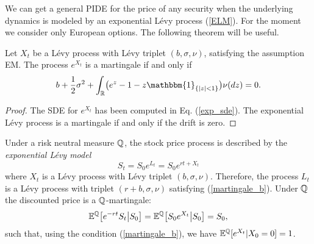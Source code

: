 We can get a general PIDE for the price of any security when the underlying dynamics is modeled by an exponential L\'evy process (\ref{ELM}). For the moment we consider only European
options. 
The following theorem will be useful.
\begin{Theorem}
 Let $X_t$ be a Lévy process with Lévy triplet $(b,\sigma,\nu)$, satisfying the assumption EM. The process $e^{X_t}$ is a martingale if and only if
 \begin{equation}\label{martingale_b}
  b +\frac{1}{2} \sigma^2  + \int_{\R} \bigl( e^z-1 -z\mathbbm{1}_{\{ |z|<1 \}} \bigr) \nu(dz) = 0.
 \end{equation}
\end{Theorem}
\begin{proof}
 The SDE for $e^{X_t}$ has been computed in Eq. (\ref{exp_sde}). The exponential Lévy process is a martingale if and only if the drift is zero.
\end{proof}
Under a risk neutral measure $\mathbb{Q}$, the stock price process is described by the \emph{exponential Lévy model}
\begin{equation}\label{ELM2}
 S_t = S_0 e^{L_t} = S_0 e^{rt + X_t}
\end{equation}
where $X_t$ is a Lévy process with Lévy triplet $(b,\sigma,\nu)$. Therefore, the process $L_t$ is a Lévy process with triplet $(r+b,\sigma,\nu)$ satisfying (\ref{martingale_b}).  
Under $\mathbb{Q}$ the discounted price is a $\mathbb{Q}$-martingale:
\begin{equation}
 \mathbb{E}^{\mathbb{Q}} \bigl[ e^{-rt} S_t \bigr| S_0 \bigr] =  \mathbb{E}^{\mathbb{Q}} \bigl[ S_0e^{X_t} \bigr| S_0 \bigr] = S_0, 
\end{equation}
such that, using the condition (\ref{martingale_b}), we have $\mathbb{E}^{\mathbb{Q}}[ e^{X_t} | X_0=0] = 1 $. 

